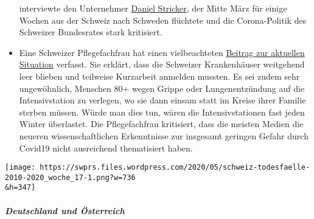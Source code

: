 \begin{itemize}
  interviewte den Unternehmer
  \href{https://www.youtube.com/user/timturpis/videos}{Daniel Stricker},
  der Mitte März für einige Wochen aus der Schweiz nach Schweden
  flüchtete und die Corona-Politik des Schweizer Bundesrates stark
  kritisiert.
\item
  Eine Schweizer Pflegefachfrau hat einen vielbeachteten
  \href{https://www.facebook.com/simone.christinat/posts/10221314943115981}{Beitrag
  zur aktuellen Situation} verfasst. Sie erklärt, dass die Schweizer
  Krankenhäuser weitgehend leer blieben und teilweise Kurzarbeit
  anmelden mussten. Es sei zudem sehr ungewöhnlich, Menschen 80+ wegen
  Grippe oder Lungenentzündung auf die Intensivstation zu verlegen, wo
  sie dann einsam statt im Kreise ihrer Familie sterben müssen. Würde
  man dies tun, wären die Intensivstationen fast jeden Winter
  überlastet. Die Pflegefachfrau kritisiert, dass die meisten Medien die
  neueren wissenschaftlichen Erkenntnisse zur insgesamt geringen Gefahr
  durch Covid19 nicht ausreichend thematisiert haben.
\end{itemize}

\texttt{[image: https://swprs.files.wordpress.com/2020/05/schweiz-todesfaelle-2010-2020\_woche\_17-1.png?w=736\\\&h=347]}

\hypertarget{deutschland-und-uxf6sterreich}{%
\subparagraph{\texorpdfstring{\textbf{Deutschland und
Österreich}}{Deutschland und Österreich}}\label{deutschland-und-uxf6sterreich}}

